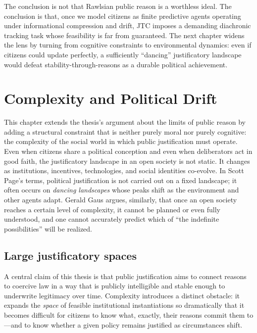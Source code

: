 \documentclass[12pt]{report}
\begin{document}
The conclusion is not that Rawlsian public reason is a worthless ideal. The conclusion is that, once we model citizens as finite predictive agents operating under informational compression and drift, JTC imposes a demanding diachronic tracking task whose feasibility is far from guaranteed. The next chapter widens the lens by turning from cognitive constraints to environmental dynamics: even if citizens could update perfectly, a sufficiently \enquote{dancing} justificatory landscape would defeat stability-through-reasons as a durable political achievement.

\chapter{Complexity and Political Drift}

\noindent This chapter extends the thesis’s argument about the limits of public reason by adding a structural constraint that is neither purely moral nor purely cognitive: the complexity of the social world in which public justification must operate. Even when citizens share a political conception and even when deliberators act in good faith, the justificatory landscape in an open society is not static. It changes as institutions, incentives, technologies, and social identities co-evolve. In Scott Page’s terms, political justification is not carried out on a fixed landscape; it often occurs on \emph{dancing landscapes} whose peaks shift as the environment and other agents adapt. \parencite[p.~94]{page2011diversity} Gerald Gaus argues, similarly, that once an open society reaches a certain level of complexity, it cannot be planned or even fully understood, and one cannot accurately predict which of “the indefinite possibilities” will be realized. \parencite[p.~14]{gaus2021open}

\section{Large justificatory spaces}

A central claim of this thesis is that public justification aims to connect reasons to coercive law in a way that is publicly intelligible and stable enough to underwrite legitimacy over time. Complexity introduces a distinct obstacle: it expands the \emph{space} of feasible institutional instantiations so dramatically that it becomes difficult for citizens to know what, exactly, their reasons commit them to---and to know whether a given policy remains justified as circumstances shift.
\end{document}

